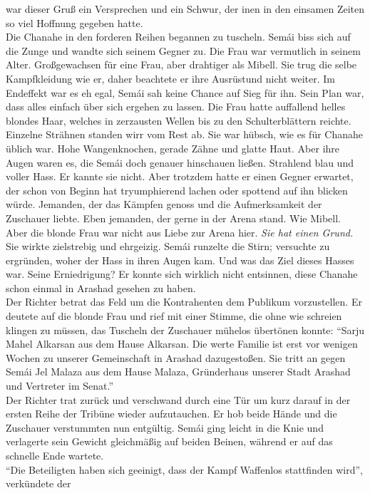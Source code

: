 war dieser Gruß ein Versprechen und ein Schwur, der inen in den einsamen Zeiten so viel Hoffnung 
gegeben hatte. \\
Die Chanahe in den forderen Reihen begannen zu tuscheln. Semái biss sich auf die Zunge und wandte 
sich seinem Gegner zu. Die Frau war vermutlich in seinem Alter. Großgewachsen für eine Frau, aber 
drahtiger als Mibell. Sie trug die selbe Kampfkleidung wie er, daher beachtete er ihre Ausrüstund 
nicht weiter. Im Endeffekt war es eh egal, Semái sah keine Chance auf Sieg für ihn. Sein Plan war, 
dass alles einfach über sich ergehen zu lassen. Die Frau hatte auffallend helles blondes Haar, 
welches in zerzausten Wellen bis zu den Schulterblättern reichte. Einzelne Strähnen standen wirr 
vom Rest ab. Sie war hübsch, wie es für Chanahe üblich war. Hohe Wangenknochen, gerade Zähne und 
glatte Haut. Aber ihre Augen waren es, die Semái doch genauer hinschauen ließen. Strahlend blau und 
voller Hass. Er kannte sie nicht. Aber trotzdem hatte er einen Gegner erwartet, der schon von 
Beginn hat tryumphierend lachen oder spottend auf ihn blicken würde. Jemanden, der das Kämpfen 
genoss und die Aufmerksamkeit der Zuschauer liebte. Eben jemanden, der gerne in der Arena stand. 
Wie Mibell. Aber die blonde Frau war nicht aus Liebe zur Arena hier. \textit{Sie hat einen Grund.}\\
Sie wirkte zielstrebig und ehrgeizig. Semái runzelte die Stirn; versuchte zu ergründen, woher der 
Hass in ihren Augen kam. Und was das Ziel dieses Hasses war. Seine Erniedrigung? Er konnte sich 
wirklich nicht entsinnen, diese Chanahe schon einmal in Arashad gesehen zu haben.\\
Der Richter betrat das Feld um die Kontrahenten dem Publikum vorzustellen. Er deutete auf die 
blonde Frau und rief mit einer Stimme, die ohne wie schreien klingen zu müssen, das 
Tuscheln der Zuschauer mühelos übertönen konnte: ``Sarju Mahel Alkarsan aus dem Hause Alkarsan. Die 
werte Familie ist erst vor wenigen Wochen zu unserer Gemeinschaft in Arashad dazugestoßen. Sie 
tritt an gegen Semái Jel Malaza aus dem Hause Malaza, Gründerhaus unserer Stadt Arashad und 
Vertreter im Senat.''\\
Der Richter trat zurück und verschwand durch eine Tür um kurz darauf in der ersten Reihe der 
Tribüne wieder aufzutauchen. Er hob beide Hände und die Zuschauer verstummten nun entgültig. Semái 
ging leicht in die Knie und verlagerte sein Gewicht gleichmäßig auf beiden Beinen, während er auf 
das schnelle Ende wartete.\\
``Die Beteiligten haben sich geeinigt, dass der Kampf Waffenlos stattfinden wird'', verkündete der 
